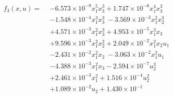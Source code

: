 \documentclass[%
 reprint,
 amsmath,amssymb,
 aps,
]{revtex4-2}
\begin{document}
\begin{align*}
f_3(x,u) = \
\
& - 6.573\times10^{-9}x_1^5x_3^3 + 1.747\times10^{-6}x_1^4x_3^3 \\
&- 1.548\times10^{-4}x_1^3x_3^3 
\
- 3.569\times10^{-3}x_1^2x_2^3 \\
&+ 4.571\times10^{-3}x_1^2x_3^3 + 4.953\times10^{-5}x_1^3x_3 \\
\
& + 9.596\times10^{-3}x_1^2x_2^2 + 2.049\times10^{-2}x_1^2x_2u_1 \\
&- 2.431\times10^{-2}x_1^2x_2 
\
- 3.063\times10^{-2}x_1^2u_1 \\
&- 4.388\times10^{-3}x_1^2x_3 - 2.594\times10^{-7}u_2^3 \\
\
& + 2.461\times10^{-3}x_1^2 + 1.516\times10^{-4}u_2^2 \\
&+ 1.089\times10^{-2}u_2 + 1.430\times10^{-1}
\tag{26}
\end{align*}
\end{document}

